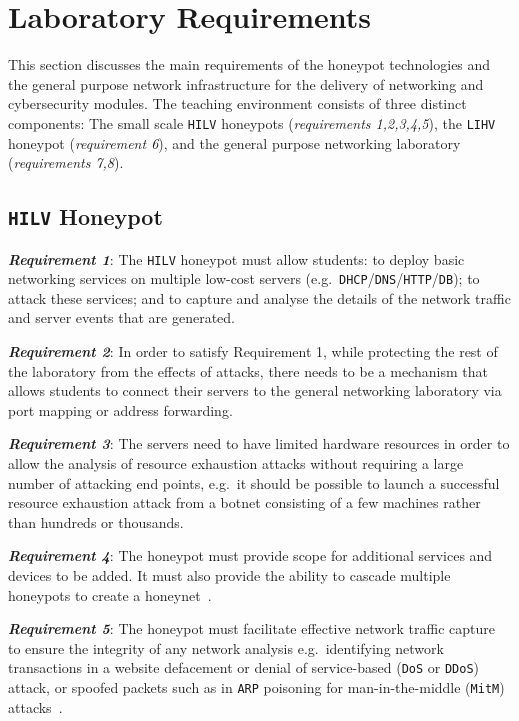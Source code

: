 \documentclass{ieeeaccess}
\begin{document}
\section{Laboratory Requirements}\label{sec:TeachingRequire}

This section discusses the main requirements of the honeypot technologies and
the general purpose network infrastructure for the delivery of networking and
cybersecurity modules. The teaching environment consists of three distinct
components: The small scale \texttt{HILV} honeypots (\textit{requirements
1,2,3,4,5}), the \texttt{LIHV} honeypot (\textit{requirement 6}), and the
general purpose networking laboratory (\textit{requirements 7,8}).

\subsection{\texttt{HILV} Honeypot}\label{subsec:ResearchHoneypot}

\noindent\textit{\textbf{Requirement 1}}:
The \texttt{HILV} honeypot must allow students: to deploy basic networking services
on multiple low-cost servers
(e.g.\ \texttt{DHCP}/\texttt{DNS}/\texttt{HTTP}/\texttt{DB}); to attack these
services; and to capture and analyse the details of the network traffic
and server events that are generated.

\noindent\textit{\textbf{Requirement 2}}:
In order to satisfy Requirement 1, while protecting the rest of the laboratory
from the effects of attacks, there needs to be a mechanism that allows students
to connect their servers to the general networking laboratory via port mapping
or address forwarding.

\noindent\textit{\textbf{Requirement 3}}:
The servers need to have limited hardware resources in order to allow the
analysis of resource exhaustion attacks without requiring a large number of
attacking end points, e.g.\ it should be possible to launch a successful
resource exhaustion attack from a botnet consisting of a few machines rather
than hundreds or thousands.

\noindent\textit{\textbf{Requirement 4}}:
The honeypot must provide scope for additional services and devices to be
added. It must also provide the ability to cascade multiple honeypots to create
a honeynet~\cite{AA:15,FDF:15,KNC:15}.

\noindent\textit{\textbf{Requirement 5}}:
The honeypot must facilitate effective network traffic capture to ensure the
integrity of any network analysis e.g.\ identifying network transactions in a
website defacement or denial of service-based (\texttt{DoS} or \texttt{DDoS})
attack, or spoofed packets such as in \texttt{ARP} poisoning for
man-in-the-middle (\texttt{MitM}) attacks~\cite{PS:16,RSKA:16}.
\end{document}
